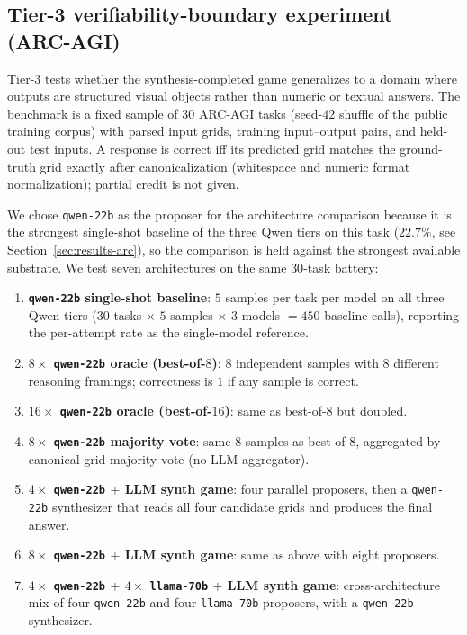 \documentclass[11pt]{amsart}
\newcommand\1{{\mathds{1}}}
\theoremstyle{definition}
\theoremstyle{remark}
\numberwithin{equation}{section}
\begin{document}
\subsection{Tier-3 verifiability-boundary experiment (ARC-AGI)}\label{app:tier3}

Tier-3 tests whether the synthesis-completed game generalizes to a domain where outputs are structured visual objects rather than numeric or textual answers.
The benchmark is a fixed sample of $30$ ARC-AGI tasks (seed-$42$ shuffle of the public training corpus) with parsed input grids, training input--output pairs, and held-out test inputs.
A response is correct iff its predicted grid matches the ground-truth grid exactly after canonicalization (whitespace and numeric format normalization); partial credit is not given.

We chose \texttt{qwen-22b} as the proposer for the architecture comparison because it is the strongest single-shot baseline of the three Qwen tiers on this task ($22.7\%$, see Section~\ref{sec:results-arc}), so the comparison is held against the strongest available substrate.
We test seven architectures on the same $30$-task battery:
\begin{enumerate}[leftmargin=1.4em, itemsep=2pt]
\item \textbf{\texttt{qwen-22b} single-shot baseline}: $5$ samples per task per model on all three Qwen tiers ($30$ tasks $\times$ $5$ samples $\times$ $3$ models $=\!450$ baseline calls), reporting the per-attempt rate as the single-model reference.
\item \textbf{$8\times$ \texttt{qwen-22b} oracle (best-of-$8$)}: $8$ independent samples with $8$ different reasoning framings; correctness is $1$ if any sample is correct.
\item \textbf{$16\times$ \texttt{qwen-22b} oracle (best-of-$16$)}: same as best-of-$8$ but doubled.
\item \textbf{$8\times$ \texttt{qwen-22b} majority vote}: same $8$ samples as best-of-$8$, aggregated by canonical-grid majority vote (no LLM aggregator).
\item \textbf{$4\times$ \texttt{qwen-22b} $+$ LLM synth game}: four parallel proposers, then a \texttt{qwen-22b} synthesizer that reads all four candidate grids and produces the final answer.
\item \textbf{$8\times$ \texttt{qwen-22b} $+$ LLM synth game}: same as above with eight proposers.
\item \textbf{$4\times$ \texttt{qwen-22b} $+$ $4\times$ \texttt{llama-70b} $+$ LLM synth game}: cross-architecture mix of four \texttt{qwen-22b} and four \texttt{llama-70b} proposers, with a \texttt{qwen-22b} synthesizer.
\end{enumerate}
\end{document}
